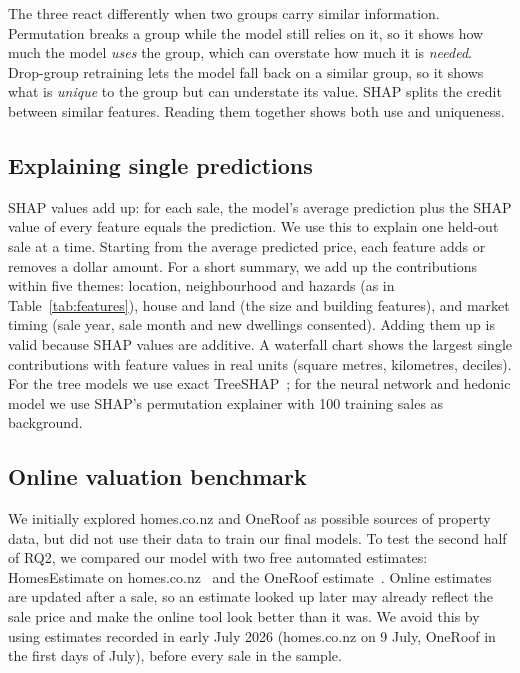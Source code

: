 \documentclass[conference]{IEEEtran}
\begin{document}
The three react differently when two groups carry similar information.
Permutation breaks a group while the model still relies on it, so it
shows how much the model \emph{uses} the group, which can overstate how
much it is \emph{needed}. Drop-group retraining lets the model fall back
on a similar group, so it shows what is \emph{unique} to the group but
can understate its value. SHAP splits the credit between similar
features. Reading them together shows both use and uniqueness.

\subsection{Explaining single predictions}\label{sec:explain}
SHAP values add up: for each sale, the model's average prediction plus
the SHAP value of every feature equals the prediction. We use this to
explain one held-out sale at a time. Starting from the average predicted
price, each feature adds or removes a dollar amount. For a short
summary, we add up the contributions within five themes: location,
neighbourhood and hazards (as in Table~\ref{tab:features}), house and
land (the size and building features), and market timing (sale year,
sale month and new dwellings consented). Adding them up is valid because
SHAP values are additive. A waterfall chart shows the largest single
contributions with feature values in real units (square metres,
kilometres, deciles). For the tree models we use exact
TreeSHAP~\cite{lundberg2017}; for the neural network and hedonic model
we use SHAP's permutation explainer with 100 training sales as
background.

\subsection{Online valuation benchmark}\label{sec:onlineval}
We initially explored homes.co.nz and OneRoof as possible sources of
property data, but did not use their data to train our final models.
To test the second half of RQ2, we compared our model with two free
automated estimates: HomesEstimate on homes.co.nz~\cite{homesnz} and the
OneRoof estimate~\cite{oneroof}. Online estimates are updated after a
sale, so an estimate looked up later may already reflect the sale price
and make the online tool look better than it was. We avoid this by using
estimates recorded in early July 2026 (homes.co.nz on 9 July, OneRoof in
the first days of July), before every sale in the sample.
\end{document}
